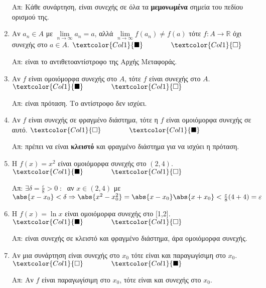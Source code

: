 \documentclass[a4paper,table]{report}
\begin{document}
\begin{enumerate}[itemsep=.5\baselineskip]
    Απ: Κάθε συνάρτηση, είναι συνεχής σε όλα τα \textbf{μεμονωμένα} σημεία του πεδίου 
    ορισμού της.

  \item \textcolor{Col1}{Αν $ a_{n} \in A $ με $ \lim\limits_{n \to \infty} a_{n}=a $,  
      αλλά $ \lim\limits_{n \to \infty} f(a_{n}) \neq f(a) $ τότε $ f \colon A \to 
    \mathbb{R}$ όχι συνεχής στο $ a \in A $}.
    \hfill $\textcolor{Col1}{\blacksquare} \qquad \qquad \textcolor{Col1}{\square}$

    Απ: είναι το αντιθετοαντίστροφο της Αρχής Μεταφοράς.

  \item \textcolor{Col1}{Αν $f$ είναι ομοιόμορφα συνεχής στο $A$, τότε $f$ είναι  
    συνεχής στο $A$}.
    \hfill $\textcolor{Col1}{\blacksquare} \qquad \qquad \textcolor{Col1}{\square}$

    Απ: είναι πρόταση. Το αντίστροφο δεν ισχύει.

  \item \textcolor{Col1}{Αν $f$ είναι συνεχής σε φραγμένο διάστημα, τότε η $f$ 
    είναι ομοιόμορφα συνεχής σε αυτό}.
    \hfill $\textcolor{Col1}{\square} \qquad \qquad \textcolor{Col1}{\blacksquare}$

    Απ: πρέπει να είναι \textbf{κλειστό} και φραγμένο διάστημα για να ισχύει η πρόταση.

  \item \textcolor{Col1}{Η $ f(x)=x^{2} $ είναι ομοιόμορφα συνεχής στο $ (2,4) $}.
    \hfill $\textcolor{Col1}{\blacksquare} \qquad \qquad \textcolor{Col1}{\square}$

    Απ: $ \exists \delta = \frac{\varepsilon}{8} > 0 \; : \; $ αν $ x \in (2,4) $ με 
    $ \abs{x- x_{0}} < \delta \Rightarrow \abs{x^{2}- x_{0}^{2}} = \abs{x- x_{0}}
    \abs{x+ x_{0}} < \frac{\varepsilon}{8} (4+4) = \varepsilon $

  \item \textcolor{Col1}{Η $ f(x)= \ln{x} $ είναι ομοιόμορφα συνεχής στο [1,2]}.
    \hfill $\textcolor{Col1}{\blacksquare} \qquad \qquad \textcolor{Col1}{\square}$

    Απ: είναι συνεχής σε κλειστό και φραγμένο διάστημα, άρα ομοιόμορφα συνεχής.

  \item \textcolor{Col1}{Αν μια συνάρτηση είναι συνεχής στο $ x_{0} $ τότε είναι και 
    παραγωγίσιμη στο $ x_{0} $}.
    \hfill $\textcolor{Col1}{\square} \qquad \qquad \textcolor{Col1}{\blacksquare}$

    Απ: Αν $f$ είναι παραγωγίσιμη στο $ x_{0} $, τότε είναι και συνεχής στο $ x_{0} $.


\end{enumerate}
\end{document}
